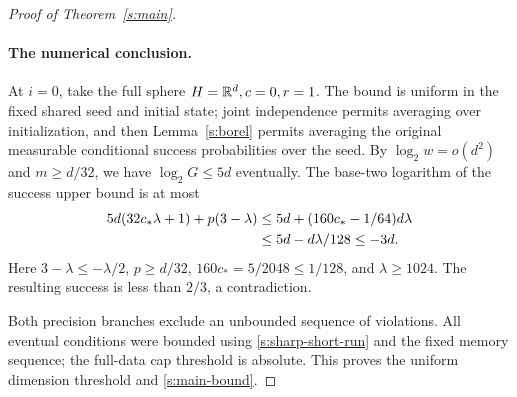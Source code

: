 \begin{proof}[Proof of Theorem~\ref{s:main}]
\paragraph{The numerical conclusion.}
At \(i=0\), take the full sphere \(H=\mathbb R^d,c=0,r=1\).
The bound is uniform in the fixed shared seed and initial state;
joint independence permits averaging over initialization, and then
Lemma~\ref{s:borel} permits averaging the original measurable
conditional success probabilities over the seed. By
\(\log_2w=o(d^2)\) and \(m\ge d/32\), we have
\(\log_2G\le5d\) eventually. The base-two logarithm of the success
upper bound is at most
\begin{align}
 5d(32c_*\lambda+1)+p(3-\lambda)
 &\le5d+(160c_*-1/64)d\lambda\notag\\
 &\le5d-d\lambda/128\le-3d.\label{s:numeric-arithmetic}
\end{align}
Here \(3-\lambda\le-\lambda/2\), \(p\ge d/32\),
\(160c_*=5/2048\le1/128\), and \(\lambda\ge1024\).
The resulting success is less than \(2/3\), a contradiction.

Both precision branches exclude an unbounded sequence of violations.
All eventual conditions were bounded using
\eqref{s:sharp-short-run} and the fixed memory sequence; the
full-data cap threshold is absolute. This proves the uniform
dimension threshold and \eqref{s:main-bound}.
\end{proof}
